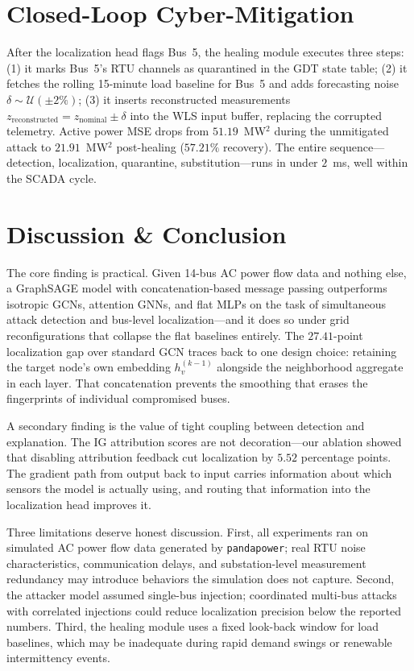 \documentclass[conference]{IEEEtran}
\begin{document}
\section{Closed-Loop Cyber-Mitigation}
After the localization head flags Bus~5, the healing module executes three steps: (1) it marks Bus~5's RTU channels as quarantined in the GDT state table; (2) it fetches the rolling 15-minute load baseline for Bus~5 and adds forecasting noise $\delta \sim \mathcal{U}(\pm2\%)$; (3) it inserts reconstructed measurements $z_{\text{reconstructed}} = z_{\text{nominal}} \pm \delta$ into the WLS input buffer, replacing the corrupted telemetry. Active power MSE drops from $51.19$~MW$^2$ during the unmitigated attack to $21.91$~MW$^2$ post-healing ($57.21\%$ recovery). The entire sequence---detection, localization, quarantine, substitution---runs in under $2$~ms, well within the SCADA cycle.

\section{Discussion \& Conclusion}

The core finding is practical. Given 14-bus AC power flow data and nothing else, a GraphSAGE model with concatenation-based message passing outperforms isotropic GCNs, attention GNNs, and flat MLPs on the task of simultaneous attack detection and bus-level localization---and it does so under grid reconfigurations that collapse the flat baselines entirely. The $27.41$-point localization gap over standard GCN traces back to one design choice: retaining the target node's own embedding $h_v^{(k-1)}$ alongside the neighborhood aggregate in each layer. That concatenation prevents the smoothing that erases the fingerprints of individual compromised buses.

A secondary finding is the value of tight coupling between detection and explanation. The IG attribution scores are not decoration---our ablation showed that disabling attribution feedback cut localization by $5.52$ percentage points. The gradient path from output back to input carries information about which sensors the model is actually using, and routing that information into the localization head improves it.

Three limitations deserve honest discussion. First, all experiments ran on simulated AC power flow data generated by \texttt{pandapower}; real RTU noise characteristics, communication delays, and substation-level measurement redundancy may introduce behaviors the simulation does not capture. Second, the attacker model assumed single-bus injection; coordinated multi-bus attacks with correlated injections could reduce localization precision below the reported numbers. Third, the healing module uses a fixed look-back window for load baselines, which may be inadequate during rapid demand swings or renewable intermittency events.
\end{document}

